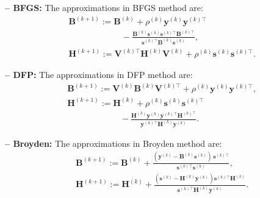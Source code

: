 \documentclass[lang=cn,10pt]{gorgeousnbook}
\numberwithin{equation}{section}%
\numberwithin{figure}{section}%
\begin{document}
\textbf{-- BFGS: }
The approximations in BFGS method are:
\begin{equation}\label{equation_BFGS_Hessian}
\begin{aligned}
& \boldsymbol{B}^{(k+1)} := \boldsymbol{B}^{(k)} + \rho^{(k)} \boldsymbol{y}^{(k)} \boldsymbol{y}^{(k)\top} \\
&~~~~~~~~~~~~~~~~~~~~~~~~~~~~ - \frac{\boldsymbol{B}^{(k)} \boldsymbol{s}^{(k)} \boldsymbol{s}^{(k)\top} \boldsymbol{B}^{(k)\top}}{\boldsymbol{s}^{(k)\top} \boldsymbol{B}^{(k)} \boldsymbol{s}^{(k)}}, \\
& \boldsymbol{H}^{(k+1)} := \boldsymbol{V}^{(k)\top} \boldsymbol{H}^{(k)} \boldsymbol{V}^{(k)} + \rho^{(k)} \boldsymbol{s}^{(k)} \boldsymbol{s}^{(k)\top}. 
\end{aligned}
\end{equation}

\textbf{-- DFP: }
The approximations in DFP method are:
\begin{equation}\label{equation_DFP_Hessian}
\begin{aligned}
& \boldsymbol{B}^{(k+1)} := \boldsymbol{V}^{(k)} \boldsymbol{B}^{(k)} \boldsymbol{V}^{(k)\top} + \rho^{(k)} \boldsymbol{y}^{(k)} \boldsymbol{y}^{(k)\top}, \\
& \boldsymbol{H}^{(k+1)} := \boldsymbol{H}^{(k)} + \rho^{(k)} \boldsymbol{s}^{(k)} \boldsymbol{s}^{(k)\top} \\
&~~~~~~~~~~~~~~~~~~~~~~~~~~~~ - \frac{\boldsymbol{H}^{(k)} \boldsymbol{y}^{(k)} \boldsymbol{y}^{(k)\top} \boldsymbol{H}^{(k)\top}}{\boldsymbol{y}^{(k)\top} \boldsymbol{H}^{(k)} \boldsymbol{y}^{(k)}}.
\end{aligned}
\end{equation}

\textbf{-- Broyden: }
The approximations in Broyden method are:
\begin{equation}
\begin{aligned}
& \boldsymbol{B}^{(k+1)} := \boldsymbol{B}^{(k)} + \frac{(\boldsymbol{y}^{(k)} - \boldsymbol{B}^{(k)} \boldsymbol{s}^{(k)})\, \boldsymbol{s}^{(k)\top}}{\boldsymbol{s}^{(k)\top} \boldsymbol{s}^{(k)}}, \\
& \boldsymbol{H}^{(k+1)} := \boldsymbol{H}^{(k)} + \frac{(\boldsymbol{s}^{(k)} - \boldsymbol{H}^{(k)} \boldsymbol{y}^{(k)}) \boldsymbol{s}^{(k)\top} \boldsymbol{H}^{(k)}}{\boldsymbol{s}^{(k)\top} \boldsymbol{H}^{(k)} \boldsymbol{y}^{(k)}}.
\end{aligned}
\end{equation}
\end{document}

